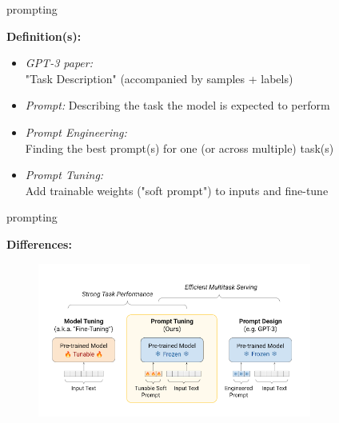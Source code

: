 \begin{vbframe}{prompting}

\vfill

\textbf{Definition(s):}

	\begin{itemize}
		\item \textit{GPT-3 paper:}\\ "Task Description" (accompanied by samples + labels)
		\item \textit{Prompt:} Describing the task the model is expected to perform
		\item \textit{Prompt Engineering:}\\ Finding the best prompt(s) for one (or across multiple) task(s)
		\item \textit{Prompt Tuning:}\\ Add trainable weights ("soft prompt") to inputs and fine-tune
	\end{itemize}
	
\vfill

\end{vbframe}


\begin{vbframe}{prompting}

\vfill
	
\textbf{Differences:}

\begin{figure}
	\centering
		\includegraphics[width = 9cm]{figure/prompts.png}\\ 
\end{figure}

\vfill

\end{vbframe}


